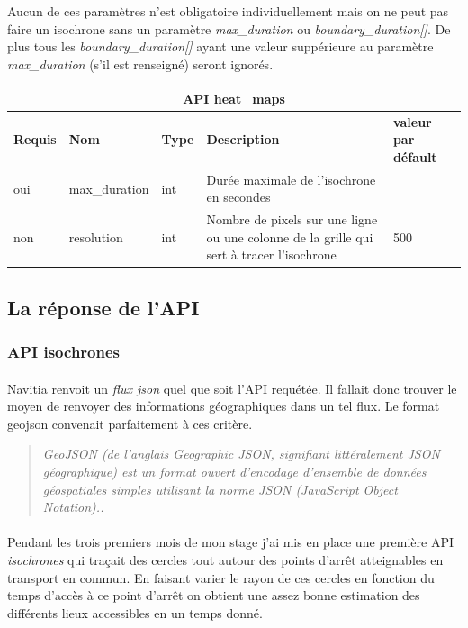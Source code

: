 \documentclass[a4paper]{report}
\begin{document}
Aucun de ces paramètres n'est obligatoire individuellement mais on ne peut pas faire un isochrone sans un paramètre \emph{max\_duration} ou \emph{boundary\_duration[]}. De plus tous les \emph{boundary\_duration[]} ayant une valeur suppérieure au paramètre \emph{max\_duration} (s'il est renseigné) seront ignorés. 

\begin{center}
	\begin{tabular}{|l|l|p{1.5cm}|p{6cm}|l|}
	\hline
	\multicolumn{5}{|c|}{\cellcolor{LightCyan} \textbf{API heat\_maps}} \\
	\hline
	\textbf{Requis} & \textbf{Nom} & \textbf{Type} & \textbf{Description} &  \textbf{valeur par défault} \\
	\hline
	oui & max\_duration & int & Durée maximale de l'isochrone en secondes &\\
	\hline
	non & resolution & int & Nombre de pixels sur une ligne ou une colonne de la grille qui sert à tracer l'isochrone & 500\\
	\hline
	\end{tabular}
\end{center}

\subsection{La réponse de l'API}

\subsubsection{API isochrones} 

\paragraph{}Navitia renvoit un \emph{flux json} quel que soit l'API requétée. Il fallait donc trouver le moyen de renvoyer des informations géographiques dans un tel flux. Le format geojson convenait parfaitement à ces critère.

\begin{quote}
	\emph{GeoJSON (de l'anglais Geographic JSON, signifiant littéralement JSON géographique) est un format ouvert d'encodage d'ensemble de données géospatiales simples utilisant la norme JSON (JavaScript Object Notation).\cite{ref}.}
\end{quote}


\paragraph{} Pendant les trois premiers mois de mon stage j'ai mis en place une première API \emph{isochrones} qui traçait des cercles tout autour des points d'arrêt atteignables en transport en commun. En faisant varier le rayon de ces cercles en fonction du temps d'accès à ce point d'arrêt on obtient une assez bonne estimation des différents lieux accessibles en un temps donné.
\end{document}
